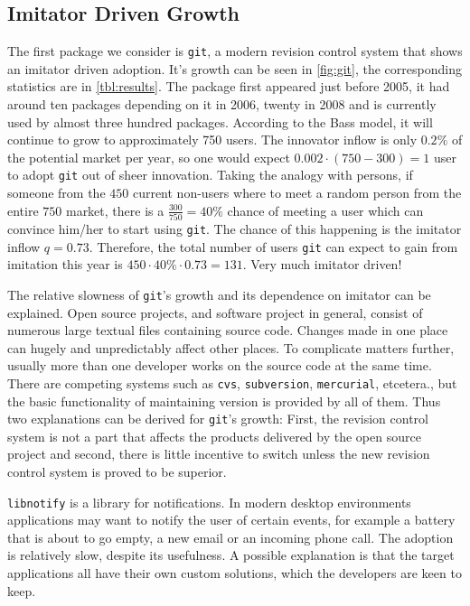 \documentclass[smallextended,final]{svjour3}
\begin{document}
\subsection{Imitator Driven Growth}

The first package we consider is \verb|git|, a modern revision control system that shows an imitator driven adoption. It's growth can be seen in \ref{fig:git}, the corresponding statistics are in \ref{tbl:results}. The package first appeared just before 2005, it had around ten packages depending on it in 2006, twenty in 2008 and is currently used by almost three hundred packages. According to the Bass model, it will continue to grow to approximately 750 users. The innovator inflow is only $0.2\%$ of the potential market per year, so one would expect $0.002\cdot (750 - 300) = 1$ user to adopt \verb|git| out of sheer innovation. Taking the analogy with persons, if someone from the $450$ current non-users where to meet a random person from the entire $750$ market, there is a $\frac{300}{750}= 40\%$ chance of meeting a user which can convince him/her to start using \verb|git|. The chance of this happening is the imitator inflow $q = 0.73$. Therefore, the total number of users \verb|git| can expect to gain from imitation this year is $450\cdot 40\%\cdot 0.73 = 131$. Very much imitator driven!

The relative slowness of \verb|git|'s growth and its dependence on imitator can be explained. Open source projects, and software project in general, consist of numerous large textual files containing source code. Changes made in one place can hugely and unpredictably affect other places. To complicate matters further, usually more than one developer works on the source code at the same time. There are competing systems such as \verb|cvs|, \verb|subversion|, \verb|mercurial|, etcetera., but the basic functionality of maintaining version is provided by all of them. Thus two explanations can be derived for \verb|git|'s growth: First, the revision control system is not a part that affects the products delivered by the open source project and second, there is little incentive to switch unless the new revision control system is proved to be superior.

\verb|libnotify| is a library for notifications. In modern desktop environments applications may want to notify the user of certain events, for example a battery that is about to go empty, a new email or an incoming phone call. The adoption is relatively slow, despite its usefulness. A possible explanation is that the target applications all have their own custom solutions, which the developers are keen to keep.
\end{document}
